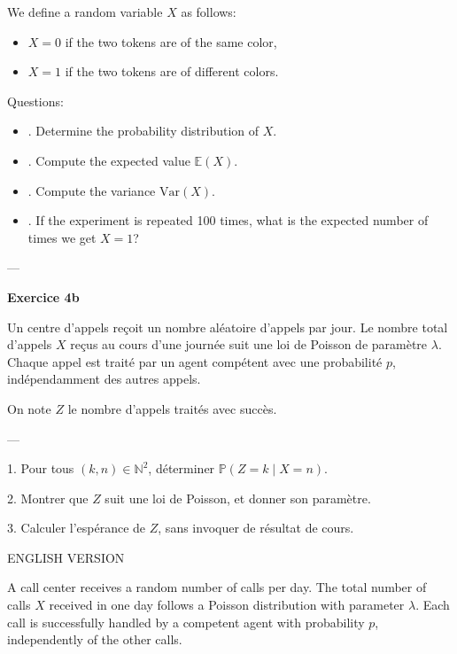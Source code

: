\documentclass[a4paper,12pt]{article}
\begin{document}
We define a random variable \( X \) as follows:
\begin{itemize}
\item \( X = 0 \) if the two tokens are of the same color,  
\item \( X = 1 \) if the two tokens are of different colors.
\end{itemize}

\noindent
Questions:

\begin{itemize}

\item. Determine the probability distribution of \( X \).  
\item. Compute the expected value \( \mathbb{E}(X) \).  
\item. Compute the variance \( \mathrm{Var}(X) \).  
\item. If the experiment is repeated 100 times, what is the expected number of times we get \( X = 1 \)?
\end{itemize}

---

\hline

\bigskip
\noindent
\textbf{Exercice 4b}

Un centre d'appels reçoit un nombre aléatoire d'appels par jour. Le nombre total d'appels \( X \) reçus au cours d'une journée suit une loi de Poisson de paramètre \( \lambda \). Chaque appel est traité par un agent compétent avec une probabilité \( p \), indépendamment des autres appels.

On note \( Z \) le nombre d'appels traités avec succès.

---


1. Pour tous \( (k, n) \in \mathbb{N}^2 \), déterminer \( \mathbb{P}(Z = k \mid X = n) \). 

2. Montrer que \( Z \) suit une loi de Poisson, et donner son paramètre.

3. Calculer l’espérance de \( Z \), sans invoquer de résultat de cours.

\vspace{1em}
\begin{center}
ENGLISH VERSION
\end{center}

A call center receives a random number of calls per day. The total number of calls \( X \) received in one day follows a Poisson distribution with parameter \( \lambda \).
Each call is successfully handled by a competent agent with probability \( p \), independently of the other calls.
\end{document}
